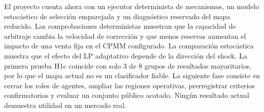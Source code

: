 El proyecto cuenta ahora con un ejecutor determinista de mecanismos, un modelo
estocástico de selección emparejada y un diagnóstico reservado del mapa reducido. Las
comprobaciones deterministas muestran que la capacidad de arbitraje cambia la velocidad
de corrección y que menos reservas aumentan el impacto de una venta fija en el CPMM
configurado. La comparación estocástica muestra que el efecto del LP adaptativo depende
de la dirección del shock. La primera prueba H1c coincide con solo 3 de 8 grupos de
resultados mayoritarios, por lo que el mapa actual no es un clasificador fiable. La
siguiente fase consiste en cerrar los roles de agentes, ampliar las regiones operativas,
prerregistrar criterios confirmatorios y evaluar un conjunto público acotado. Ningún
resultado actual demuestra utilidad en un mercado real.

